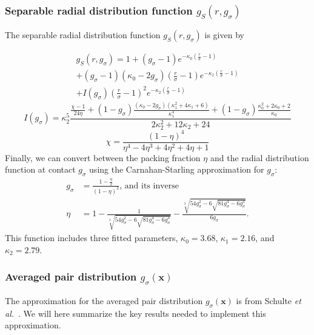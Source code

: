 \documentclass[letterpaper,twocolumn,amsmath,amssymb,pre,aps,10pt]{revtex4-1}
\newcommand\rr{\mathbf{x}}
\begin{document}
\subsubsection{Separable radial distribution function
  $g_S(r,g_\sigma)$}

The separable radial distribution function $g_S(r,g_\sigma)$ is given
by
\newcommand\kappaO{\kappa_0}
\newcommand\kappaI{\kappa_1}
\newcommand\kappaZ{\kappa_2}
\newcommand\kappazero{3.68}
\newcommand\kappaone{2.16}
\newcommand\kappatwo{2.79}

\begin{multline}
  g_S(r,g_\sigma) = 1 + (g_\sigma-1) e^{-\kappaO \left(\frac{r}{\sigma}-1\right)} \\
  + (g_\sigma -1)(\kappaO - 2g_\sigma)  \left(\frac{r}{\sigma}-1\right)e^{-\kappaI  \left(\frac{r}{\sigma}-1\right)} \\
  + I(g_\sigma)  \left(\frac{r}{\sigma}-1\right)^2e^{-\kappaZ  \left(\frac{r}{\sigma}-1\right)}
\end{multline}
\begin{equation}
  I(g_\sigma) = \kappaZ^5 \frac{
    \frac{\chi-1}{24\eta} + (1-g_\sigma) \frac{(\kappaO-2
      g_\sigma)(\kappaI^2 + 4 \kappaI + 6)}{\kappaI^4}
    + (1-g_\sigma)\frac{\kappaO^2 + 2\kappaO + 2}{\kappaO}
  }{2 \kappaZ^2 + 12 \kappaZ + 24}
\end{equation}
\begin{equation}
  \chi = \frac{(1-\eta)^4}{\eta^4 - 4\eta^3 + 4\eta^2 + 4\eta + 1}
\end{equation}
Finally, we can convert between the packing fraction $\eta$ and the
radial distribution function at contact $g_\sigma$ using the
Carnahan-Starling approximation for $g_\sigma$:
\newcommand\nastyetacuberoot{\sqrt[3]{54 g_\sigma^2 -
    6\sqrt{81g_\sigma^4 - 6g_\sigma^3}}}
\begin{align}
  g_\sigma &= \frac{1-\tfrac{\eta}{2}}{(1-\eta)^3}\text{, and its inverse} \\
  \eta &= 1 - \frac{1}{\nastyetacuberoot} - \frac{\nastyetacuberoot}{6g_\sigma}.
\end{align}
This function includes three fitted parameters, $\kappaO =
\kappazero$, $\kappaI = \kappaone$,
and $\kappaZ = \kappatwo$.


\subsubsection{Averaged pair distribution  $g_\sigma(\rr)$}

The approximation for the averaged pair distribution $g_\sigma(\rr)$
is from Schulte \emph{et al.}~\cite{schulte2012using}.  We will here
summarize the key results needed to implement this approximation.
\end{document}
